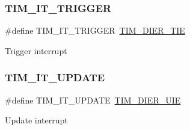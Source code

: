 \subsubsection{\texorpdfstring{TIM\_IT\_TRIGGER}{TIM\_IT\_TRIGGER}}
{\footnotesize\ttfamily \#define T\+I\+M\+\_\+\+I\+T\+\_\+\+T\+R\+I\+G\+G\+ER~\mbox{\hyperlink{group___peripheral___registers___bits___definition_gaa755fef2c4e96c63f2ea1cd9a32f956a}{T\+I\+M\+\_\+\+D\+I\+E\+R\+\_\+\+T\+IE}}}

Trigger interrupt \mbox{\label{group___t_i_m___interrupt__definition_ga6a48ecf88cae0402ff084202bfdd4f8e}} 
\subsubsection{\texorpdfstring{TIM\_IT\_UPDATE}{TIM\_IT\_UPDATE}}
{\footnotesize\ttfamily \#define T\+I\+M\+\_\+\+I\+T\+\_\+\+U\+P\+D\+A\+TE~\mbox{\hyperlink{group___peripheral___registers___bits___definition_ga5c6d3e0495e6c06da4bdd0ad8995a32b}{T\+I\+M\+\_\+\+D\+I\+E\+R\+\_\+\+U\+IE}}}

Update interrupt 